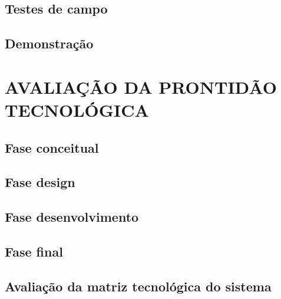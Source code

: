 \section{Testes de campo}
\label{sec:tstcamp}

\section{Demonstração}
\label{sec:tstconcl}

\chapter{AVALIAÇÃO DA PRONTIDÃO TECNOLÓGICA}
\label{chap:trl}

\section{Fase conceitual}
\label{sec:trlconc}

\section{Fase design}
\label{sec:trldesig}

\section{Fase desenvolvimento}
\label{sec:trldesen}

\section{Fase final}
\label{sec:trlconcl}

\section{Avaliação da matriz tecnológica do sistema}
\label{sec:avaltec}


